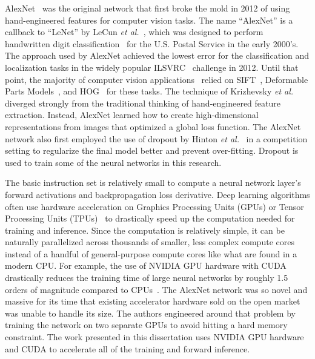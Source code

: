 AlexNet~\cite{krizhevsky_imagenet_2012} was the original network that first broke the mold in 2012 of using hand-engineered features for computer vision tasks.  The name ``AlexNet'' is a callback to ``LeNet'' by LeCun \textit{et al.}~\cite{lecun_comparison_1995,lecun_gradient-based_1998}, which was designed to perform handwritten digit classification~\cite{simard_best_2003} for the U.S. Postal Service in the early 2000's.  The approach used by AlexNet achieved the lowest error for the classification and localization tasks in the widely popular ILSVRC~\cite{russakovsky_imagenet_2015} challenge in 2012. Until that point, the majority of computer vision applications~\cite{bertozzi_pedestrian_2007,dalal_histograms_2005,zhu_fast_2006} relied on SIFT~\cite{lowe_distinctive_2004}, Deformable Parts Models~\cite{felzenszwalb_discriminatively_2008}, and HOG~\cite{dalal_histograms_2005} for these tasks.  The technique of Krizhevsky \textit{et al.} diverged strongly from the traditional thinking of hand-engineered feature extraction.  Instead, AlexNet learned how to create high-dimensional representations from images that optimized a global loss function.  The AlexNet network also first employed the use of dropout by Hinton \textit{et al.}~\cite{hinton_improving_2012} in a competition setting to regularize the final model better and prevent over-fitting.  Dropout is used to train some of the neural networks in this research.

The basic instruction set is relatively small to compute a neural network layer's forward activations and backpropagation loss derivative.  Deep learning algorithms often use hardware acceleration on Graphics Processing Units (GPUs) or Tensor Processing Units (TPUs)~\cite{jouppi_-datacenter_2017} to drastically speed up the computation needed for training and inference. Since the computation is relatively simple, it can be naturally parallelized across thousands of smaller, less complex compute cores instead of a handful of general-purpose compute cores like what are found in a modern CPU.  For example, the use of NVIDIA GPU hardware with CUDA~\cite{nickolls_scalable_2008} drastically reduces the training time of large neural networks by roughly 1.5 orders of magnitude compared to CPUs~\cite{nickolls_scalable_2008}.  The AlexNet network was so novel and massive for its time that existing accelerator hardware sold on the open market was unable to handle its size.  The authors engineered around that problem by training the network on two separate GPUs to avoid hitting a hard memory constraint.  The work presented in this dissertation uses NVIDIA GPU hardware and CUDA to accelerate all of the training and forward inference.

